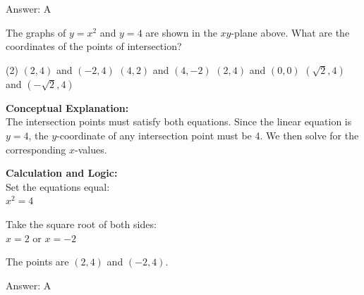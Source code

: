 \documentclass[11pt,paper=a4,answers]{exam}
\begin{document}
\begin{questions}
\begin{solution}
\vspace{25pt}

Answer: \colorbox{yellow!100}{A}
\end{solution}

\vspace{40pt}

\question
\begin{center}
\end{center}
The graphs of $y = x^2$ and $y = 4$ are shown in the $xy$-plane above. What are the coordinates of the points of intersection?
\begin{tasks}(2)
    \task $(2, 4)$ and $(-2, 4)$
    \task $(4, 2)$ and $(4, -2)$
    \task $(2, 4)$ and $(0, 0)$
    \task $(\sqrt{2}, 4)$ and $(-\sqrt{2}, 4)$
\end{tasks}

\begin{solution}
\textbf{Conceptual Explanation:} \\
The intersection points must satisfy both equations. Since the linear equation is $y = 4$, the $y$-coordinate of any intersection point must be 4. We then solve for the corresponding $x$-values.

\vspace{20pt}

\textbf{Calculation and Logic:} \\
Set the equations equal: \\
$x^2 = 4$

\vspace{10pt}

Take the square root of both sides: \\
$x = 2$ or $x = -2$

\vspace{10pt}

The points are $(2, 4)$ and $(-2, 4)$.

\vspace{25pt}

Answer: \colorbox{yellow!100}{A}
\end{solution}


\end{questions}
\end{document}
